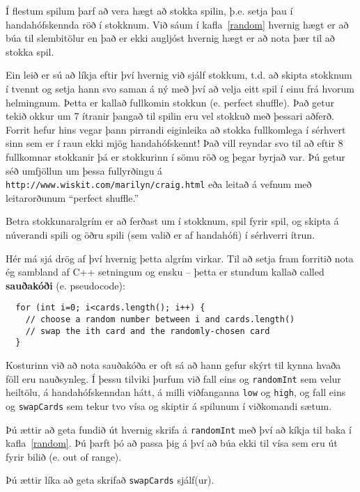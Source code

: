 Í flestum spilum þarf að vera hægt að stokka spilin, þ.e. setja þau í handahófskennda röð í stokknum.
Við sáum í kafla~\ref{random} hvernig hægt er að búa til slembitölur en það er ekki augljóst hvernig hægt er 
að nota þær til að stokka spil.

Ein leið er sú að líkja eftir því hvernig við sjálf stokkum, t.d. að skipta stokknum í tvennt
og setja hann svo saman á ný með því að velja eitt spil í einu frá hvorum helmingnum.
Þetta er kallað fullkomin stokkun (e. perfect shuffle).
Það getur tekið okkur um 7 ítranir þangað til spilin eru vel stokkuð með þessari aðferð.
Forrit hefur hins vegar þann pirrandi eiginleika að stokka fullkomlega í sérhvert sinn sem er í raun ekki mjög handahófskennt!
Það vill reyndar svo til að eftir 8 fullkomnar stokkanir þá er stokkurinn í sömu röð og þegar byrjað var.
Þú getur séð umfjöllun um þessa fullyrðingu á {\tt http://www.wiskit.com/marilyn/craig.html} eða leitað á vefnum
með leitarorðunum ``perfect shuffle.''

Betra stokkunaralgrím er að ferðast um í stokknum, spil fyrir spil, og skipta á núverandi spili og öðru spili (sem valið er af handahófi) í sérhverri ítrun. 


Hér má sjá drög af því hvernig þetta algrím virkar.
Til að setja fram forritið nota ég sambland af C++ setningum og ensku -- þetta er stundum kallað 
called {\bf sauðakóði} (e. pseudocode):

\begin{verbatim}
  for (int i=0; i<cards.length(); i++) {
    // choose a random number between i and cards.length()
    // swap the ith card and the randomly-chosen card
  }
\end{verbatim}
%
Kosturinn við að nota sauðakóða er oft sá að hann gefur skýrt til kynna hvaða föll eru nauðsynleg.
Í þessu tilviki þurfum við fall eins og {\tt randomInt} sem velur heiltölu, á handahófskenndan hátt, á milli
viðfanganna {\tt low} og {\tt high}, og fall eins og {\tt swapCards} sem tekur tvo vísa og skiptir á spilunum í viðkomandi sætum.


Þú ættir að geta fundið út hvernig skrifa á {\tt randomInt} með því að kíkja til baka í kafla~\ref{random}.
Þú þarft þó að passa þig á því að búa ekki til vísa sem eru út fyrir bilið (e. out of range). 


Þú ættir líka að geta skrifað {\tt swapCards} sjálf(ur). 

